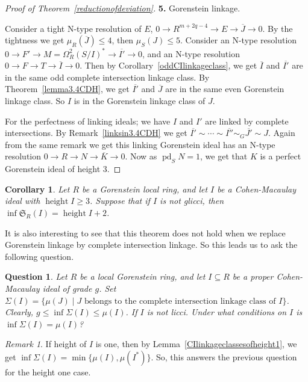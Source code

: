 \documentclass[11pt,letterpaper]{amsart}
\newcommand{\x}{\xrightarrow{}}
\DeclareMathOperator{\height}{height}
\theoremstyle{plain}
\newtheorem{cor}[thm]{Corollary}
\newtheorem{question}[thm]{Question}
\theoremstyle{definition}
\theoremstyle{remark}
\newtheorem{remark}[thm]{Remark}
\begin{document}
\begin{proof}[Proof of Theorem~\ref{reductionofdeviation}]
\noindent\textbf{5.} Gorenstein linkage. 

Consider a tight N-type resolution of $E$, $0\x R^{m+2q-4}\x E\x \overline{J}\x 0$. By the tightness we get $\mu_R(\overline{J})\le 4$, then $\mu_S(J)\le 5$. Consider an N-type resolution $0\x F'\x M=\Omega^2_R(S/I)^*\x \overline{I'}\x 0$, and an N-type resolution $0\x F\x T\x \overline{I}\x 0$. Then by Corollary~\ref{oddCIlinkageclass}, we get $\overline{I}$ and $\overline{I'}$ are in the same odd complete intersection linkage class. By Theorem~\ref{lemma3.4CDH}, we get $\overline{I'}$ and $\overline{J}$ are in the same even Gorenstein linkage class. So $I$ is in the Gorenstein linkage class of $J$.

For the perfectness of linking ideals; we have $I$ and $I'$ are linked by complete intersections. By Remark~\ref{linksin3.4CDH} we get $\overline{I'}\sim\cdots \sim \overline{I''}\sim_G\overline{J'}\sim J$. Again from the same remark we get this linking Gorenstein ideal has an N-type resolution $0\x R\x N\x \overline{K}\x 0$. Now as $\operatorname{pd}_S N=1$, we get that $K$ is a perfect Gorenstein ideal of height 3.  

\end{proof}

\begin{cor}
    Let $R$ be a Gorenstein local ring, and let $I$ be a Cohen-Macaulay ideal with $\height I\ge 3$. Suppose that if $I$ is not glicci, then $\inf \mathfrak{S}_R(I)=\height I+2$.
\end{cor}

It is also interesting to see that this theorem does not hold when we replace Gorenstein linkage by complete intersection linkage. So this leads us to ask the following question.

\begin{question}\label{minimaldeviation} Let $R$ be a local Gorenstein ring, and let $I\subseteq R$ be a proper Cohen-Macaulay ideal
of grade $g$. Set $\Sigma(I)=\{\mu(J)\mid J \text{ belongs to the
complete intersection linkage class of } I\}$. Clearly, $g\leq\inf\Sigma(I)\leq\mu(I)$. If $I$ is not licci. Under what conditions on $I$ is $\inf\Sigma(I)=\mu(I)$?   
\end{question}

\begin{remark}
    If height of $I$ is one, then by Lemma~\ref{CIlinkageclassesofheight1}, we get $\inf\Sigma(I)=\min\{\mu(I),\mu(I^*)\}$. So, this answers the previous question for the height one case.
\end{remark}
\end{document}
